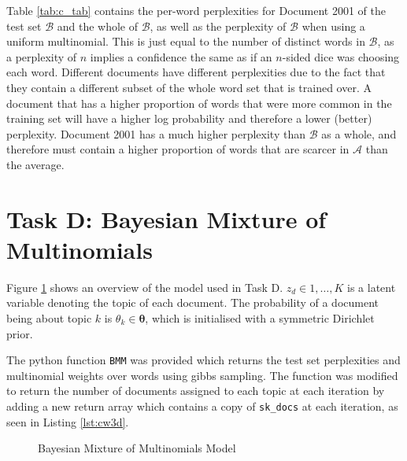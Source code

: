 \documentclass[11pt]{amsart}
\begin{document}
Table \ref{tab:c_tab} contains the per-word perplexities for Document 2001 of the test set $\mathcal{B}$ and the whole of $\mathcal{B}$, as well as the perplexity of $\mathcal{B}$ when using a uniform multinomial. This is just equal to the number of distinct words in $\mathcal{B}$, as a perplexity of $n$ implies a confidence the same as if an $n$-sided dice was choosing each word. Different documents have different perplexities due to the fact that they contain a different subset of the whole word set that is trained over. A document that has a higher proportion of words that were more common in the training set will have a higher log probability and therefore a lower (better) perplexity. Document 2001 has a much higher perplexity than $\mathcal{B}$ as a whole, and therefore must contain a higher proportion of words that are scarcer in $\mathcal{A}$ than the average.

\section{Task D: Bayesian Mixture of Multinomials} \label{sec:d}
Figure \ref{fig:d_model} shows an overview of the model used in Task D. $z_d \in {1, \dots, K}$ is a latent variable denoting the topic of each document. The probability of a document being about topic $k$ is $\theta_k \in \bm{\theta}$, which is initialised with a symmetric Dirichlet prior.

The python function \verb|BMM| was provided which returns the test set perplexities and multinomial weights over words using gibbs sampling. The function was modified to return the number of documents assigned to each topic at each iteration by adding a new return array which contains a copy of \verb|sk_docs| at each iteration, as seen in Listing \ref{lst:cw3d}.

\begin{figure}[h]
    \centering
    \caption[Bayesian Mixture of Multinomials Model]{Bayesian Mixture of Multinomials Model\protect\footnotemark} \label{fig:d_model}
\end{figure}
\end{document}
